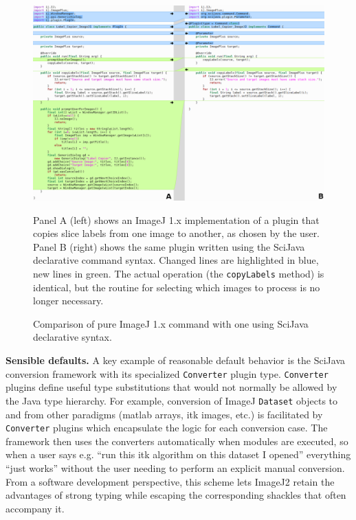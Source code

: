 \documentclass{bmcart}
\begin{document}
  \begin{figure}[h]
    \caption{Comparison of pure ImageJ 1.x command with one using SciJava
    declarative syntax.}
    \includegraphics[width=4.75in,natwidth=1327,natheight=889]{figure-5/figure-labeled.png}
    \begin{flushleft}
      \footnotesize
      Panel A (left) shows an ImageJ 1.x implementation of a plugin that copies
      slice labels from one image to another, as chosen by the user. Panel B
      (right) shows the same plugin written using the SciJava declarative
      command syntax. Changed lines are highlighted in blue, new lines in
      green. The actual operation (the \texttt{copyLabels} method) is
      identical, but the routine for selecting which images to process is no
      longer necessary.
    \end{flushleft}
  \end{figure}

\textbf{Sensible defaults.} A key example of reasonable default behavior is the
SciJava conversion framework with its specialized \texttt{Converter} plugin
type. \texttt{Converter} plugins define useful type substitutions that would
not normally be allowed by the Java type hierarchy. For example, conversion of
ImageJ \texttt{Dataset} objects to and from other paradigms (\acrshort{matlab}
arrays, \acrshort{itk} images, etc.) is facilitated by \texttt{Converter}
plugins which encapsulate the logic for each conversion case. The framework
then uses the converters automatically when modules are executed, so when a
user says e.g. ``run this \acrshort{itk} algorithm on this dataset I opened''
everything ``just works'' without the user needing to perform an explicit
manual conversion. From a software development perspective, this scheme lets
ImageJ2 retain the advantages of strong typing while escaping the corresponding
shackles that often accompany it.
\end{document}
